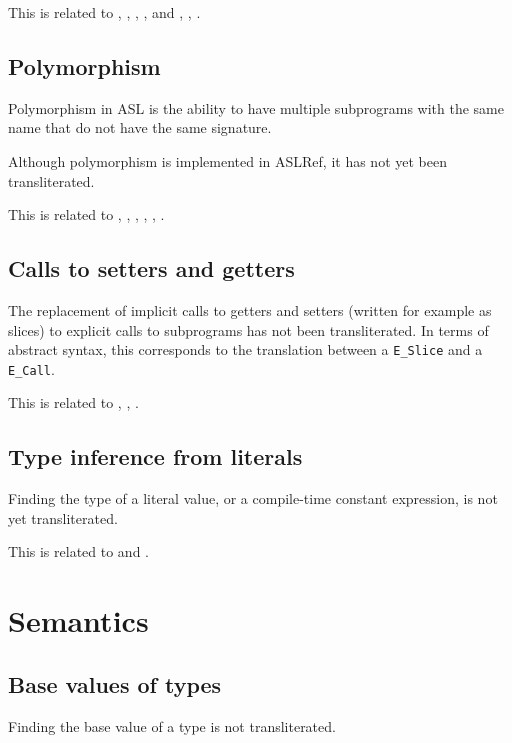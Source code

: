 \documentclass{book}
\begin{document}
This is related to , , , ,
and , , .

\subsection{Polymorphism}

Polymorphism in ASL is the ability to have multiple subprograms with the same
name that do not have the same signature.

Although polymorphism is implemented in ASLRef, it has not yet been
transliterated.

This is related to , , , ,
, .

\subsection{Calls to setters and getters}

The replacement of implicit calls to getters and setters (written for example as
slices) to explicit calls to subprograms has not been transliterated.
%
In terms of abstract syntax, this corresponds to the translation between a
\texttt{E\_Slice} and a \texttt{E\_Call}.

This is related to , , .

\subsection{Type inference from literals}

Finding the type of a literal value, or a compile-time constant expression, is
not yet transliterated.

This is related to  and .

\section{Semantics}

\subsection{Base values of types}

Finding the base value of a type is not transliterated.
\end{document}
